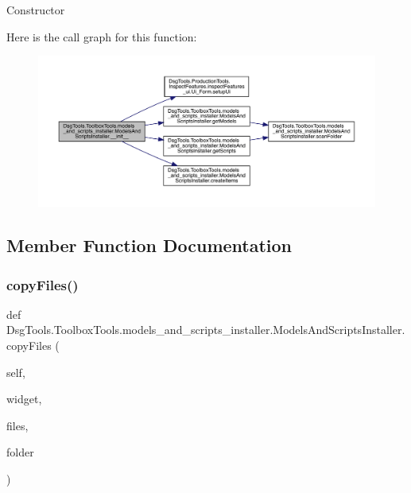 \begin{DoxyVerb}Constructor
\end{DoxyVerb}
 Here is the call graph for this function\+:
\nopagebreak
\begin{figure}[H]
\begin{center}
\leavevmode
\includegraphics[width=350pt]{class_dsg_tools_1_1_toolbox_tools_1_1models__and__scripts__installer_1_1_models_and_scripts_installer_aaf848cb9823f47ecec353b5622308007_cgraph}
\end{center}
\end{figure}


\subsection{Member Function Documentation}
\mbox{\label{class_dsg_tools_1_1_toolbox_tools_1_1models__and__scripts__installer_1_1_models_and_scripts_installer_ae7e84dd0125fcda0198d5cf207c49fcb}} 
\subsubsection{\texorpdfstring{copy\+Files()}{copyFiles()}}
{\footnotesize\ttfamily def Dsg\+Tools.\+Toolbox\+Tools.\+models\+\_\+and\+\_\+scripts\+\_\+installer.\+Models\+And\+Scripts\+Installer.\+copy\+Files (\begin{DoxyParamCaption}\item[{}]{self,  }\item[{}]{widget,  }\item[{}]{files,  }\item[{}]{folder }\end{DoxyParamCaption})}

